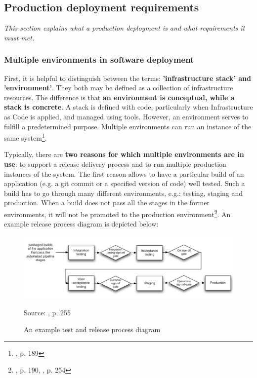 \subsection{Production deployment requirements}
\textit{This section explains what a production deployment is and what requirements it must met.}
~\\

\subsubsection{Multiple environments in software deployment}
First, it is helpful to distinguish between the terms: \textbf{'infrastructure stack' and 'environment'}. They both may be defined as a collection of infrastructure resources. The difference is that \textbf{an environment is conceptual, while a stack is concrete}. A stack is defined with code, particularly when Infrastructure as Code is applied, and managed using tools. However, an environment serves to fulfill a predetermined purpose. Multiple environments can run an instance of the same system\footnote{\cite{book-iac}, p. 189}.

Typically, there are \textbf{two reasons for which multiple environments are in use}: to support a release delivery process and to run multiple production instances of the system. The first reason allows to have a particular build of an application (e.g. a git commit or a specified version of code) well tested. Such a build has to go through many different environments, e.g.: testing, staging and production. When a build does not pass all the stages in the former environments, it will not be promoted to the production environment\footnote{\cite{book-iac}, p. 190, \cite{book-cicd}, p. 254}. An example release process diagram is depicted below:
\begin{figure}[H]
    \centering
    \includegraphics[width=16cm]{figures/cicd-example-release-diagram.png}
    \label{fig:cicd-example-release-diagram}
    \caption{An example test and release process diagram}
    \small{Source: \cite{book-cicd}, p. 255}
\end{figure}

